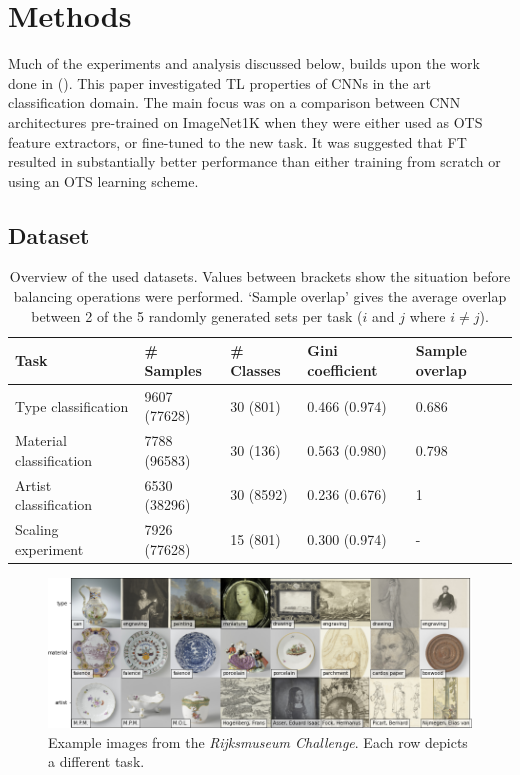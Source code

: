 \section{Methods}

Much of the experiments and analysis discussed below, builds upon the work done in \citeauthor{sabatelli2018deep} (\citeyear{sabatelli2018deep}). This paper investigated TL properties of CNNs in the art classification domain. The main focus was on a comparison between CNN architectures pre-trained on ImageNet1K when they were either used as OTS feature extractors, or fine-tuned to the new task. It was suggested that FT resulted in substantially better performance than either training from scratch or using an OTS learning scheme.

\subsection{Dataset} \label{methods:dataset}

\begin{table}[tb]
\centering
\small
\begin{tabular}{lllll}
\hline
\textbf{Task} & \textbf{\# Samples} & \textbf{\# Classes} & \textbf{Gini coefficient} & \textbf{Sample overlap} \\ \hline
Type classification & 9607 (77628) & 30 (801) & 0.466 (0.974) & 0.686 \\
Material classification & 7788 (96583) & 30 (136) & 0.563 (0.980) & 0.798 \\
Artist classification & 6530 (38296) & 30 (8592) & 0.236 (0.676) & 1 \\
Scaling experiment & 7926 (77628) & 15 (801) & 0.300 (0.974) & - \\ \hline
\end{tabular}
\caption{Overview of the used datasets. Values between brackets show the situation before balancing operations were performed. `Sample overlap' gives the average overlap between 2 of the 5 randomly generated sets per task ($i$ and $j$ where $i \neq j$).}
\label{methods:datasets}
\end{table}

\begin{figure}[bt]
\includegraphics[width=\textwidth]{img/examples.png}
\caption{Example images from the \textit{Rijksmuseum Challenge}. Each row depicts a different task.}
\label{methods:eg}
\end{figure}


